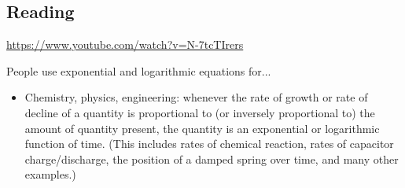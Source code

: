 



\subsection*{Reading}
\begin{center}
\begin{tcolorbox}[width=0.8\textwidth,colback={white},title={\textbf{Go and watch...}},colbacktitle=black,coltitle=white]
  \textcolor{black}{\url{https://www.youtube.com/watch?v=N-7tcTIrers}}
\end{tcolorbox}
\end{center}

\begin{center}
\begin{tcolorbox}[width=0.8\textwidth,colback={white},title={\textbf{What's it good for?}},colbacktitle=MidnightBlue,coltitle=white]
  People use exponential and logarithmic equations for...
  \begin{itemize}
    \item Chemistry, physics, engineering: whenever the rate of growth or rate of decline of a quantity is proportional to (or inversely proportional
          to) the amount of quantity present, the quantity is an exponential or logarithmic function of time. (This includes rates of chemical reaction,
          rates of capacitor charge/discharge, the position of a damped spring over time, and many other examples.)
  \end{itemize}
\end{tcolorbox}
\end{center}

